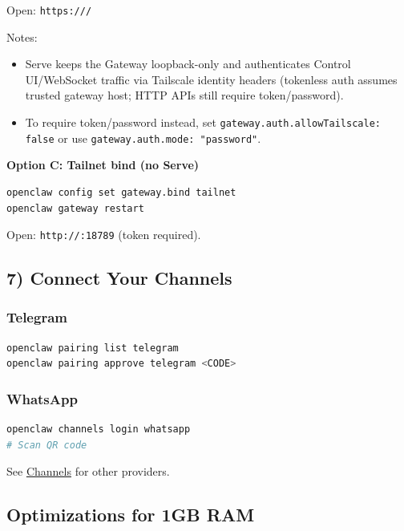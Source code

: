 Open: \texttt{https:///}

Notes:

\begin{itemize}
  \item Serve keeps the Gateway loopback-only and authenticates Control UI/WebSocket traffic via Tailscale identity headers (tokenless auth assumes trusted gateway host; HTTP APIs still require token/password).
  \item To require token/password instead, set \texttt{gateway.auth.allowTailscale: false} or use \texttt{gateway.auth.mode: "password"}.
\end{itemize}


\textbf{Option C: Tailnet bind (no Serve)}

\begin{lstlisting}[language=bash]
openclaw config set gateway.bind tailnet
openclaw gateway restart
\end{lstlisting}


Open: \texttt{http://:18789} (token required).

\subsection{7) Connect Your Channels}


\subsubsection{Telegram}


\begin{lstlisting}[language=bash]
openclaw pairing list telegram
openclaw pairing approve telegram <CODE>
\end{lstlisting}


\subsubsection{WhatsApp}


\begin{lstlisting}[language=bash]
openclaw channels login whatsapp
# Scan QR code
\end{lstlisting}


See \href{/channels}{Channels} for other providers.

\hrulefill


\subsection{Optimizations for 1GB RAM}


